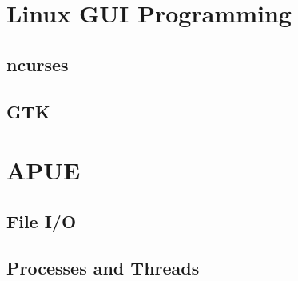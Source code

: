 \section{Linux GUI Programming}

\subsection{ncurses}

\subsection{GTK}

\section{APUE}
\subsection{File I/O}
\subsection{Processes and Threads}




